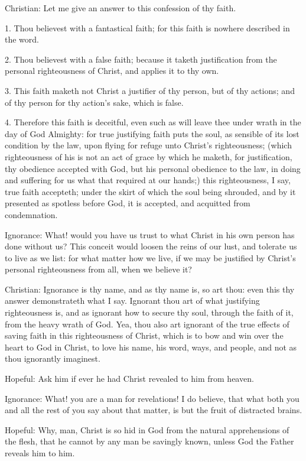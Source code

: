Christian: Let me give an answer to this confession of thy faith.

1. Thou believest with a fantastical faith; for this faith is nowhere
described in the word.

2. Thou believest with a false faith; because it taketh justification
from the personal righteousness of Christ, and applies it to thy own.

3. This faith maketh not Christ a justifier of thy person, but of thy
actions; and of thy person for thy action's sake, which is false.

4. Therefore this faith is deceitful, even such as will leave thee
under wrath in the day of God Almighty: for true justifying faith puts
the soul, as sensible of its lost condition by the law, upon flying for
refuge unto Christ's righteousness; (which righteousness of his is not
an act of grace by which he maketh, for justification, thy obedience
accepted with God, but his personal obedience to the law, in doing and
suffering for us what that required at our hands;) this righteousness,
I say, true faith accepteth; under the skirt of which the soul being
shrouded, and by it presented as spotless before God, it is accepted,
and acquitted from condemnation.

Ignorance: What! would you have us trust to what Christ in his own
person has done without us? This conceit would loosen the reins of our
lust, and tolerate us to live as we list: for what matter how we live,
if we may be justified by Christ's personal righteousness from all,
when we believe it?

Christian: Ignorance is thy name, and as thy name is, so art thou: even
this thy answer demonstrateth what I say. Ignorant thou art of what
justifying righteousness is, and as ignorant how to secure thy soul,
through the faith of it, from the heavy wrath of God. Yea, thou also
art ignorant of the true effects of saving faith in this righteousness
of Christ, which is to bow and win over the heart to God in Christ, to
love his name, his word, ways, and people, and not as thou ignorantly
imaginest.

Hopeful: Ask him if ever he had Christ revealed to him from heaven.

Ignorance: What! you are a man for revelations! I do believe, that what
both you and all the rest of you say about that matter, is but the
fruit of distracted brains.

Hopeful: Why, man, Christ is so hid in God from the natural
apprehensions of the flesh, that he cannot by any man be savingly
known, unless God the Father reveals him to him.

